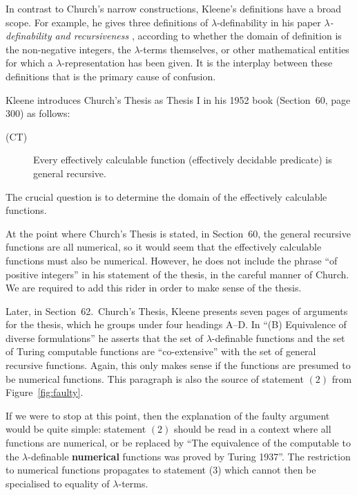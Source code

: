 \documentclass[a4paper]{article}
\begin{document}
In contrast to Church's narrow constructions, Kleene's definitions
have a broad scope. For example, he gives three definitions of
$\lambda$-definability in his paper {\em $\lambda$-definability and
  recursiveness} \cite{Kleene36}, according to whether the domain of
definition is the non-negative integers, the $\lambda$-terms themselves, or
other mathematical entities for which a $\lambda$-representation has
been given. It is the interplay between these definitions that is the
primary cause of confusion.

Kleene introduces Church's Thesis as Thesis I in his 1952 book 
(Section~60, page 300) as follows:

\begin{description}
\item[(CT)] Every effectively calculable function (effectively decidable predicate) is general recursive. 
\end{description}

\noindent
The crucial question is to determine the domain of the effectively
calculable functions.  

At the point where Church's Thesis is stated, in Section~60, the
general recursive functions are all numerical, so it would seem that
the effectively calculable functions must also be numerical.  However,
he does not include the phrase ``of positive integers'' in his
statement of the thesis, in the careful manner of Church. We are
required to add this rider in order to make sense of the thesis.

Later, in Section~62.\ Church's Thesis, Kleene presents seven pages of
arguments for the thesis, which he groups under four headings A--D.  In
``(B) Equivalence of diverse formulations'' he asserts that the set of
$\lambda$-definable functions and the set of Turing computable functions
are ``co-extensive'' with the set of general recursive functions.
Again, this only makes sense if the functions are presumed to be
numerical functions. This paragraph is also the source of statement
$(2)$ from Figure~\ref{fig:faulty}.

If we were to stop at this point, then the explanation of the faulty
argument would be quite simple: statement $(2)$ should be read in a
context where all functions are numerical, or be replaced by ``The
equivalence of the computable to the $\lambda$-definable {\bf numerical}
functions was proved by Turing 1937''. The restriction to numerical
functions propagates to statement (3) which cannot then be specialised
to equality of $\lambda$-terms. 
\end{document}

